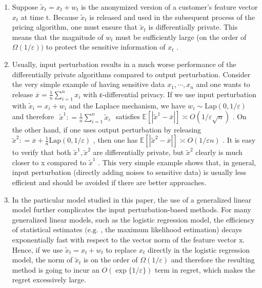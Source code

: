 \begin{enumerate}
\def\labelenumi{\arabic{enumi}.}
\item
  Suppose \(\widetilde { x } _ { t } = x _ { t } + w _ { t }\) is the anonymized version of a customer's feature vector \(x _ { t }\) at time t. Because \(\widetilde { x } _ { t }\) is released and used in the subsequent process of the pricing algorithm, one must ensure that \(\widetilde { x } _ { t }\) is differentially private. This means that the magnitude of \(w _ { t }\) must be sufficiently large (on the order of \(\Omega ( 1 / \varepsilon ) )\) to protect the sensitive information of \(x _ { t }\) .
\item
  Usually, input perturbation results in a much worse performance of the differentially private algorithms compared to output perturbation. Consider the very simple example of having sensitive data \(x _ { 1 } , \cdots , x _ { n }\) and one wants to release \(\textstyle { \overline { { x } } } = { \frac { 1 } { n } } \sum _ { i = 1 } ^ { n } x _ { i }\) with ε-differential privacy. If we use input perturbation with \(\widetilde { x } _ { i } = x _ { i } + w _ { i }\) and the Laplace mechanism, we have \(w _ { i } \sim \mathrm { L a p } ( 0 , 1 / \varepsilon )\) and therefore \(\begin{array} { r } { \widetilde { x } ^ { 1 } : = \frac { 1 } { n } \sum _ { i = 1 } ^ { n } \widetilde { x } _ { i } } \end{array}\) satisfies \(\mathbb { E } [ | \widetilde { x } ^ { 1 } - \overline { { x } } | ] \asymp O ( 1 / \varepsilon \sqrt { n } )\) . On the other hand, if one uses output perturbation by releasing \(\widetilde { x } ^ { 2 } : = \overline { { x } } + \textstyle { \frac { 1 } { n } } \mathrm { L a p } ( 0 , 1 / \varepsilon )\) , then one has \(\mathbb { E } [ | \widetilde { x } ^ { 2 } - \overline { { x } } | ] \asymp O ( 1 / \varepsilon n )\) . It is easy to verify that both \(\widetilde { x } ^ { 1 } , \widetilde { x } ^ { 2 }\) are differentially private, but \(\widetilde { x } ^ { 2 }\) clearly is much closer to x compared to \(\widetilde { x } ^ { 1 }\) . This very simple example shows that, in general, input perturbation (directly adding noises to sensitive data) is usually less efficient and should be avoided if there are better approaches.
\item
  In the particular model studied in this paper, the use of a generalized linear model further complicates the input perturbation-based methods. For many generalized linear models, such as the logistic regression model, the efficiency of statistical estimates \(( \mathrm { e . g . }\) , the maximum likelihood estimation) decays exponentially fast with respect to the vector norm of the feature vector x. Hence, if we use \(\widetilde { x } _ { t } = x _ { t } + w _ { t }\) to replace \(x _ { t }\) directly in the logistic regression model, the norm of \(\widetilde { x } _ { t }\) is on the order of \(\Omega ( 1 / \varepsilon )\) and therefore the resulting method is going to incur an \(O ( \exp \{ 1 / \varepsilon \} )\) term in regret, which makes the regret excessively large.
\end{enumerate}

